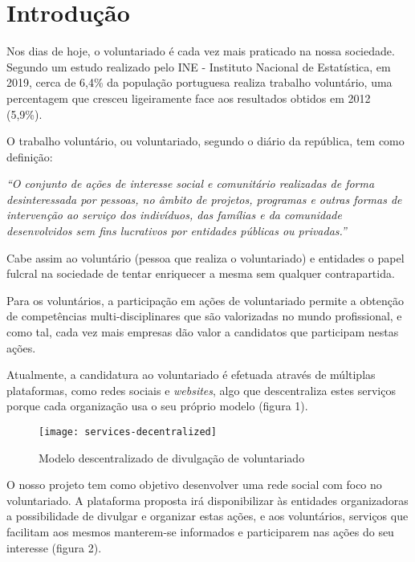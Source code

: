 \section{Introdução} \bigskip
Nos dias de hoje, o voluntariado é cada vez mais praticado na nossa sociedade. Segundo um estudo realizado pelo INE - Instituto Nacional de Estatística, em 2019, cerca de 6,4\% da população portuguesa realiza trabalho voluntário, uma percentagem que cresceu ligeiramente face aos resultados obtidos em 2012 (5,9\%).~\cite{estatistica_2019}
\par \bigskip

O trabalho voluntário, ou voluntariado, segundo o diário da república, tem como definição: \par \bigskip

\textit{
	``O conjunto de ações de interesse social e comunitário realizadas de forma desinteressada por pessoas, no âmbito de projetos, programas e outras formas de intervenção ao serviço dos indivíduos, das famílias e da comunidade desenvolvidos sem fins lucrativos por entidades públicas ou privadas.''~\cite{decreto_lei_71/98}
}\par \bigskip

Cabe assim ao voluntário (pessoa que realiza o voluntariado) e entidades o papel fulcral na sociedade de tentar enriquecer a mesma sem qualquer contrapartida. \par \bigskip

Para os voluntários, a participação em ações de voluntariado permite a obtenção de competências multi-disciplinares que são valorizadas no mundo profissional, e como tal, cada vez mais empresas dão valor a candidatos que participam nestas ações. \par \bigskip

Atualmente, a candidatura ao voluntariado é efetuada através de múltiplas plataformas, como redes sociais e \textit{websites}, algo que descentraliza estes serviços porque cada organização usa o seu próprio modelo (figura 1).

\bigskip

\begin{figure}[h]
	\centering
	\texttt{[image: services-decentralized]}
	\caption{Modelo descentralizado de divulgação de voluntariado}	
\end{figure}

\newpage

O nosso projeto tem como objetivo desenvolver uma rede social  com foco no voluntariado. A plataforma proposta irá disponibilizar às entidades organizadoras a possibilidade de divulgar e organizar estas ações, e aos voluntários, serviços que facilitam aos mesmos manterem-se informados e participarem nas ações do seu interesse (figura 2).

